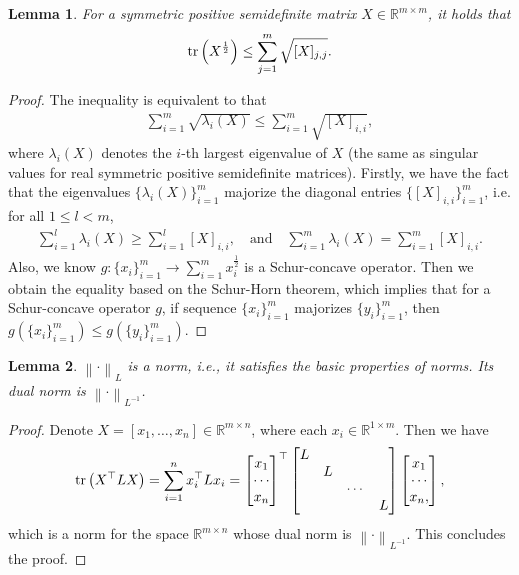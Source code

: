 \documentclass{article}
\newtheorem{lemma}{Lemma}
\theoremstyle{remark}
\newcommand{\Norm}[1]{\left\|#1\right\|}
\newcommand{\tr}[1]{{\rm tr}\left( #1 \right)}
\newcommand{\RR}{\mathbb{R}}
\begin{document}
\begin{lemma}\label{lem:matrix_square_root_trace_bound_by_square_root_diagonal}
    For a symmetric positive semidefinite matrix $X \in \RR^{m\times m}$, it holds that
    \begin{align*}
        \tr{X^{\frac{1}{2}}} \le \sum_{j=1}^m \sqrt{[X]_{j,j}}.
    \end{align*}
\end{lemma}
\begin{proof}
    The inequality is equivalent to that
    \begin{align*}
        \sum_{i=1}^m \sqrt{\lambda_i(X)} \le \sum_{i=1}^m \sqrt{[X]_{i,i}} ,
    \end{align*}
    where $\lambda_i(X)$ denotes the $i$-th largest eigenvalue of $X$ (the same as singular values for real symmetric positive semidefinite matrices). Firstly, we have the fact that the eigenvalues $\{ \lambda_i(X) \}_{i=1}^m$ majorize the diagonal entries $\{[X]_{i,i}\}_{i=1}^m$, i.e. for all $1 \le l < m$,
    \begin{align*}
        \sum_{i=1}^l \lambda_i(X) \ge \sum_{i=1}^l [X]_{i,i}, \quad \text{and} \quad \sum_{i=1}^m \lambda_i(X) = \sum_{i=1}^m [X]_{i,i} .
    \end{align*}
    Also, we know $g:\{x_i\}_{i=1}^m \to \sum_{i=1}^m x_i^{\frac{1}{2}}$ is a Schur-concave operator. Then we obtain the equality based on the Schur-Horn theorem, which implies that for a Schur-concave operator $g$, if sequence $\{x_i\}_{i=1}^m$ majorizes $\{y_i\}_{i=1}^m$, then $g(\{x_i\}_{i=1}^m) \le g(\{y_i\}_{i=1}^m)$.
\end{proof}

\begin{lemma}\label{lem:norm_L}
    $\Norm{\cdot}_L$ is a norm, i.e., it satisfies the basic properties of norms. Its dual norm is $\Norm{\cdot}_{L^{-1}}$.
\end{lemma}
\begin{proof}
    Denote $X = [x_1,\dots, x_n] \in \RR^{m\times n}$, where each $x_i \in \RR^{1\times m}$. Then we have
    \begin{align*}
        \tr{X^\top L X} = \sum_{i=1}^n x_i^\top L x_i =
    \begin{bmatrix}
        x_1 \\ \cdots \\ x_n
    \end{bmatrix}^\top
    \begin{bmatrix}
        L & & & \\ & L & & \\ & & \cdots & \\ & & & L
    \end{bmatrix}
    \begin{bmatrix}
        x_1 \\ \cdots \\ x_n ,
    \end{bmatrix} ,
    \end{align*}
    which is a norm for the space $\RR^{m\times n}$ whose dual norm is $\Norm{\cdot}_{L^{-1}}$. This concludes the proof.
\end{proof}
\end{document}
